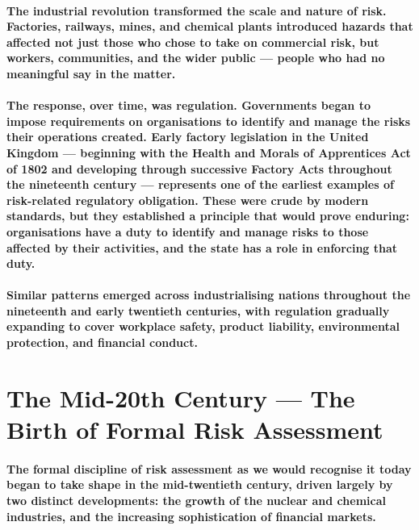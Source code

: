 \paragraph{The industrial revolution transformed the scale and nature of risk. Factories, railways, mines, and chemical plants introduced hazards that affected not just those who chose to take on commercial risk, but workers, communities, and the wider public — people who had no meaningful say in the matter.}
\paragraph{The response, over time, was \textbf{regulation}. Governments began to impose requirements on organisations to identify and manage the risks their operations created. Early factory legislation in the United Kingdom — beginning with the Health and Morals of Apprentices Act of 1802 and developing through successive Factory Acts throughout the nineteenth century — represents one of the earliest examples of risk-related regulatory obligation. These were crude by modern standards, but they established a principle that would prove enduring: \textbf{organisations have a duty to identify and manage risks to those affected by their activities, and the state has a role in enforcing that duty}.}
\paragraph{Similar patterns emerged across industrialising nations throughout the nineteenth and early twentieth centuries, with regulation gradually expanding to cover workplace safety, product liability, environmental protection, and financial conduct.}

\section{The Mid-20th Century — The Birth of Formal Risk Assessment}

\paragraph{The formal discipline of risk assessment as we would recognise it today began to take shape in the mid-twentieth century, driven largely by two distinct developments: the growth of the nuclear and chemical industries, and the increasing sophistication of financial markets.}

